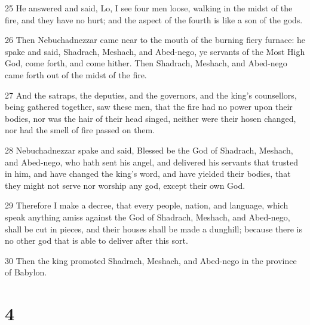 \par 25 He answered and said, Lo, I see four men loose, walking in the midst of the fire, and they have no hurt; and the aspect of the fourth is like a son of the gods.
\par 26 Then Nebuchadnezzar came near to the mouth of the burning fiery furnace: he spake and said, Shadrach, Meshach, and Abed-nego, ye servants of the Most High God, come forth, and come hither. Then Shadrach, Meshach, and Abed-nego came forth out of the midst of the fire.
\par 27 And the satraps, the deputies, and the governors, and the king's counsellors, being gathered together, saw these men, that the fire had no power upon their bodies, nor was the hair of their head singed, neither were their hosen changed, nor had the smell of fire passed on them.
\par 28 Nebuchadnezzar spake and said, Blessed be the God of Shadrach, Meshach, and Abed-nego, who hath sent his angel, and delivered his servants that trusted in him, and have changed the king's word, and have yielded their bodies, that they might not serve nor worship any god, except their own God.
\par 29 Therefore I make a decree, that every people, nation, and language, which speak anything amiss against the God of Shadrach, Meshach, and Abed-nego, shall be cut in pieces, and their houses shall be made a dunghill; because there is no other god that is able to deliver after this sort.
\par 30 Then the king promoted Shadrach, Meshach, and Abed-nego in the province of Babylon.

\chapter{4}

